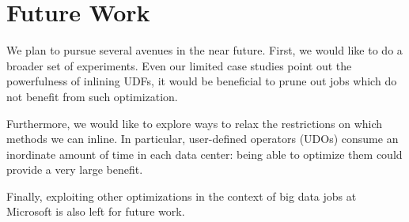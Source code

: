 \section{Future Work \label{sec:future}}

We plan to pursue several avenues in the near future.
First, we would like to do a broader set of experiments.
Even our limited case studies point out the powerfulness of inlining UDFs, it would be beneficial to prune out jobs which do not benefit from such optimization. 

Furthermore, we would like to explore ways to relax the restrictions on which methods we can inline.
In particular, user-defined operators (UDOs) consume an inordinate amount of time in each data center: being able to optimize them could provide a very large benefit.

Finally, exploiting other optimizations in the context of big data jobs at Microsoft is also left for future work.
